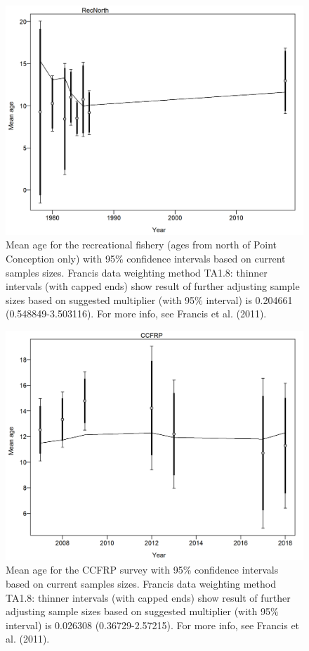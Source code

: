 \documentclass[12pt,]{article}
\begin{document}
\begin{figure}
\centering
\includegraphics{r4ss/plots_mod1/comp_condAALfit_data_weighting_TA1.8_condAgeRecNorth.png}
\caption{Mean age for the recreational fishery (ages from north of Point
Conception only) with 95\% confidence intervals based on current samples
sizes. Francis data weighting method TA1.8: thinner intervals (with
capped ends) show result of further adjusting sample sizes based on
suggested multiplier (with 95\% interval) is 0.204661
(0.548849-3.503116). For more info, see Francis et al. (2011).
\label{fig:comp_condAALfit_data_weighting_TA1.8_condAgeRecNorth}}
\end{figure}

\begin{figure}
\centering
\includegraphics{r4ss/plots_mod1/comp_condAALfit_data_weighting_TA1.8_condAgeCCFRP.png}
\caption{Mean age for the CCFRP survey with 95\% confidence intervals
based on current samples sizes. Francis data weighting method TA1.8:
thinner intervals (with capped ends) show result of further adjusting
sample sizes based on suggested multiplier (with 95\% interval) is
0.026308 (0.36729-2.57215). For more info, see Francis et al. (2011).
\label{fig:comp_condAALfit_data_weighting_TA1.8_condAgeCCFRP}}
\end{figure}
\end{document}
